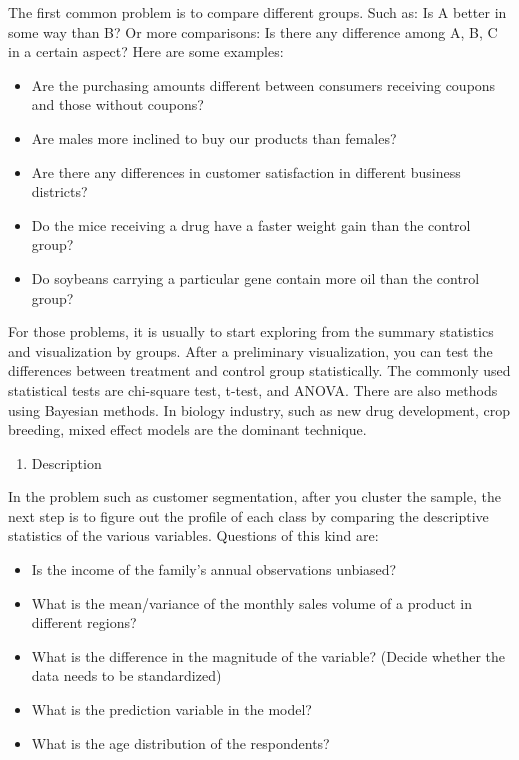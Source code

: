 \documentclass[12pt,]{krantz}
\providecommand{\tightlist}{%
  \setlength{\itemsep}{0pt}\setlength{\parskip}{0pt}}
\theoremstyle{definition}
\theoremstyle{definition}
\theoremstyle{remark}
\begin{document}
The first common problem is to compare different groups. Such as: Is A
better in some way than B? Or more comparisons: Is there any difference
among A, B, C in a certain aspect? Here are some examples:

\begin{itemize}
\tightlist
\item
  Are the purchasing amounts different between consumers receiving
  coupons and those without coupons?
\item
  Are males more inclined to buy our products than females?
\item
  Are there any differences in customer satisfaction in different
  business districts?
\item
  Do the mice receiving a drug have a faster weight gain than the
  control group?
\item
  Do soybeans carrying a particular gene contain more oil than the
  control group?
\end{itemize}

For those problems, it is usually to start exploring from the summary
statistics and visualization by groups. After a preliminary
visualization, you can test the differences between treatment and
control group statistically. The commonly used statistical tests are
chi-square test, t-test, and ANOVA. There are also methods using
Bayesian methods. In biology industry, such as new drug development,
crop breeding, mixed effect models are the dominant technique.

\begin{enumerate}
\def\labelenumi{\arabic{enumi}.}
\setcounter{enumi}{1}
\tightlist
\item
  Description
\end{enumerate}

In the problem such as customer segmentation, after you cluster the
sample, the next step is to figure out the profile of each class by
comparing the descriptive statistics of the various variables. Questions
of this kind are:

\begin{itemize}
\tightlist
\item
  Is the income of the family's annual observations unbiased?
\item
  What is the mean/variance of the monthly sales volume of a product in
  different regions?
\item
  What is the difference in the magnitude of the variable? (Decide
  whether the data needs to be standardized)
\item
  What is the prediction variable in the model?
\item
  What is the age distribution of the respondents?
\end{itemize}
\end{document}
